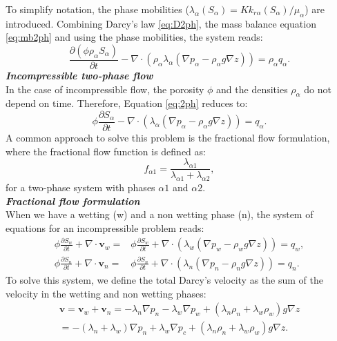 \documentclass[12pt]{article}
\begin{document}
To simplify notation, the phase mobilities ($\lambda_{\alpha}(S_{\alpha})=Kk_{r\alpha}(S_{\alpha})/\mu_{\alpha}$) are introduced. 
Combining Darcy's law \eqref{eq:D2ph}, the mass balance equation \eqref{eq:mb2ph} and using the phase mobilities, the system reads:
\begin{equation}\label{eq:2ph}
 \frac{\partial(\phi \rho_{\alpha}S_{\alpha})}{\partial t}-\nabla \cdot ( \rho_{\alpha} \lambda_{\alpha}(\nabla p_{\alpha}-\rho_{\alpha} g \nabla z))=\rho_{\alpha} q_{\alpha}.
\end{equation}
\emph{\textbf{Incompressible two-phase flow}}\\
In the case of incompressible flow, the porosity $\phi$ and the densities $\rho_{\alpha}$ do not depend on time. Therefore, Equation \eqref{eq:2ph} reduces to: 
\begin{equation}\label{eq:2ph1}
 \phi \frac{\partial S_{\alpha}}{\partial t}-\nabla \cdot (  \lambda_{\alpha}(\nabla p_{\alpha}-\rho_{\alpha}g \nabla z))= q_{\alpha}.
\end{equation}
A common approach to solve this problem is the fractional flow formulation, where the fractional flow function is defined as: $$f_{\alpha1}=\frac{\lambda_{\alpha1}}{\lambda_{\alpha1}+\lambda_{\alpha2}},$$
for a two-phase system with phases $\alpha1$ and $\alpha2$.\\
\emph{\textbf{Fractional flow formulation}}\\
When we have a wetting (w) and a non wetting phase (n), the system of equations for an incompressible problem reads:
\begin{align}\label{eq:2phff}
 \phi\frac{\partial{S}_{w}}{\partial t}+\nabla \cdot  \mathbf{v}_{w}=&\phi\frac{\partial{S}_{w}}{\partial t}+\nabla \cdot ( \lambda_{w}(\nabla p_w-\rho_wg \nabla z))= q_{w},\nonumber \\
 \phi\frac{\partial{S}_{n}}{\partial t}+\nabla \cdot \mathbf{v}_{n}=&\phi\frac{\partial{S}_{n}}{\partial t}+\nabla \cdot ( \lambda_{n}(\nabla p_n-\rho_ng \nabla z))= q_{n}.
\end{align}
To solve this system, we define the total Darcy's velocity as the sum of the velocity in the wetting and non wetting phases:
\begin{align}\label{eq:totv}
\mathbf{v}=\mathbf{v}_w+\mathbf{v}_n=-\lambda_{n}\nabla p_n-\lambda_{w}\nabla p_w+(\lambda_n \rho_n+\lambda_w\rho_w)g\nabla z \nonumber \\
=-(\lambda_n+\lambda_w)\nabla p_n+\lambda_w\nabla p_c+(\lambda_n \rho_n+\lambda_w\rho_w)g\nabla z.
\end{align}
\end{document}
